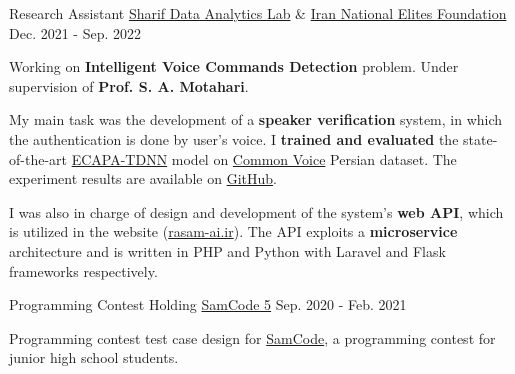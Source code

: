 

\begin{cventries}

  \cventry
    {Research Assistant} %
    {\href{https://www.sharif.edu/}{Sharif Data Analytics Lab} \& \href{https://en.bmn.ir/}{Iran National Elites Foundation}} %
    {} %
    {Dec. 2021 - Sep. 2022} %
    {
      \begin{cvitems} %
        \item {Working on \textbf{Intelligent Voice Commands Detection} problem. Under supervision of \textbf{Prof. S. A. Motahari}.}
        \item {My main task was the development of a \textbf{speaker verification} system, in which the authentication is done by user's voice. I \textbf{trained and evaluated} the state-of-the-art \href{https://arxiv.org/abs/2005.07143}{ECAPA-TDNN} model on \href{https://commonvoice.mozilla.org}{Common Voice} Persian dataset. The experiment results are available on \href{https://github.com/Sharif-DAL-INEF-1400/Verification-and-Identification-Speechbrain}{GitHub}.}
        \item{I was also in charge of design and development of the system's \textbf{web API}, which is utilized in the website (\href{https://rasam-ai.ir/}{rasam-ai.ir}). The API exploits a \textbf{microservice} architecture and is written in PHP and Python with Laravel and Flask frameworks respectively.}
      \end{cvitems}
    }

  \cventry
    {Programming Contest Holding} %
    {\href{https://samcode.allamehelli3.ir/staff.html}{SamCode 5}} %
    {} %
    {Sep. 2020 - Feb. 2021} %
    {
      \begin{cvitems} %
        \item {Programming contest test case design for {\href{https://samcode.allamehelli3.ir/}{SamCode}}, a programming contest for junior high school students.}
      \end{cvitems}
    }

\end{cventries}

